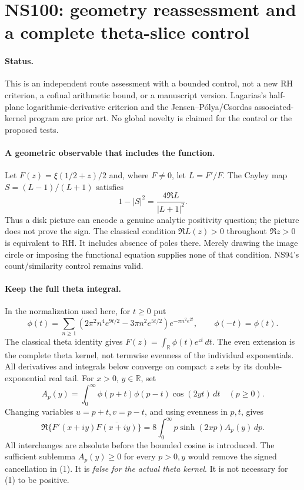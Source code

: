 \section*{NS100: geometry reassessment and a complete theta-slice control}
\paragraph{Status.} This is an independent route assessment with a bounded
control, not a new RH criterion, a cofinal arithmetic bound, or a manuscript
version. Lagarias's half-plane logarithmic-derivative criterion and the
Jensen--P\'olya/Csordas associated-kernel program are prior art. No global
novelty is claimed for the control or the proposed tests.

\paragraph{A geometric observable that includes the function.}
Let $F(z)=\xi(1/2+z)/2$ and, where $F\ne0$, let $L=F'/F$.
The Cayley map $S=(L-1)/(L+1)$ satisfies
\[
 1-|S|^2=\frac{4\Re L}{|L+1|^2}.
\]
Thus a disk picture can encode a genuine analytic positivity question;
the picture does not prove the sign. The classical condition $\Re L(z)>0$
throughout $\Re z>0$ is equivalent to RH. It includes absence of poles
there. Merely drawing the image circle or imposing the functional equation
supplies none of that condition. NS94's count/similarity control remains valid.

\paragraph{Keep the full theta integral.}
In the normalization used here, for $t\ge0$ put
\[
 \phi(t)=\sum_{n\ge1}(2\pi^2n^4e^{9t/2}-3\pi n^2e^{5t/2})
                     e^{-\pi n^2e^{2t}},\qquad\phi(-t)=\phi(t).
\]
The classical theta identity gives $F(z)=\int_{\mathbb R}\phi(t)e^{zt}\,dt$.
The even extension is the complete theta kernel, not termwise evenness
of the individual exponentials. All derivatives and integrals below
converge on compact $z$ sets by its double-exponential real tail.
For $x>0$, $y\in\mathbb R$, set
\[
 A_p(y)=\int_0^\infty\phi(p+t)\phi(p-t)\cos(2yt)\,dt\quad(p\ge0).
\]
Changing variables $u=p+t,v=p-t$, and using evenness in $p,t$, gives
\[
 \Re\{F'(x+iy)\overline{F(x+iy)}\}
     =8\int_0^\infty p\sinh(2xp)A_p(y)\,dp.                 \tag{1}
\]
All interchanges are absolute before the bounded cosine is introduced.
The sufficient sublemma $A_p(y)\ge0$ for every $p>0,y$ would remove the
signed cancellation in (1). It is \emph{false for the actual theta kernel}.
It is not necessary for (1) to be positive.

